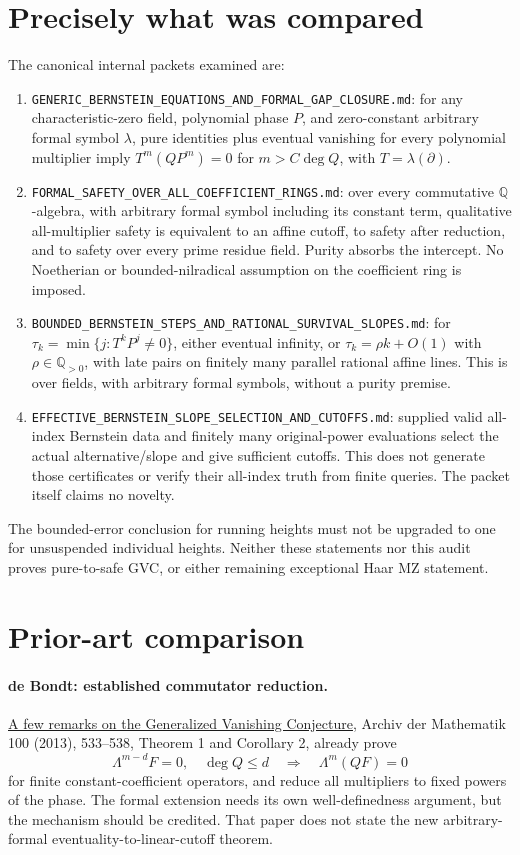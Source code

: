 \documentclass[11pt]{article}
\begin{document}
\section*{Precisely what was compared}
The canonical internal packets examined are:
\begin{enumerate}
\item \texttt{GENERIC\_BERNSTEIN\_EQUATIONS\_AND\_FORMAL\_GAP\_CLOSURE.md}: for any characteristic-zero field, polynomial phase $P$, and zero-constant arbitrary formal symbol $\lambda$, pure identities plus eventual vanishing for every polynomial multiplier imply $T^m(QP^m)=0$ for $m>C\deg Q$, with $T=\lambda(\partial)$.
\item \texttt{FORMAL\_SAFETY\_OVER\_ALL\_COEFFICIENT\_RINGS.md}: over every commutative $\mathbb Q$-algebra, with arbitrary formal symbol including its constant term, qualitative all-multiplier safety is equivalent to an affine cutoff, to safety after reduction, and to safety over every prime residue field. Purity absorbs the intercept. No Noetherian or bounded-nilradical assumption on the coefficient ring is imposed.
\item \texttt{BOUNDED\_BERNSTEIN\_STEPS\_AND\_RATIONAL\_SURVIVAL\_SLOPES.md}: for $\tau_k=\min\{j:T^kP^j\ne0\}$, either eventual infinity, or $\tau_k=\rho k+O(1)$ with $\rho\in\mathbb Q_{>0}$, with late pairs on finitely many parallel rational affine lines. This is over fields, with arbitrary formal symbols, without a purity premise.
\item \texttt{EFFECTIVE\_BERNSTEIN\_SLOPE\_SELECTION\_AND\_CUTOFFS.md}: supplied valid all-index Bernstein data and finitely many original-power evaluations select the actual alternative/slope and give sufficient cutoffs. This does not generate those certificates or verify their all-index truth from finite queries. The packet itself claims no novelty.
\end{enumerate}
The bounded-error conclusion for running heights must not be upgraded to one for unsuspended individual heights. Neither these statements nor this audit proves pure-to-safe GVC, or either remaining exceptional Haar MZ statement.

\section*{Prior-art comparison}
\paragraph{de Bondt: established commutator reduction.}
\href{https://arxiv.org/abs/1206.2836}{A few remarks on the Generalized Vanishing Conjecture}, Archiv der Mathematik 100 (2013), 533--538, Theorem 1 and Corollary 2, already prove
\[
 \Lambda^{m-d}F=0,\quad\deg Q\le d
 \quad\Longrightarrow\quad\Lambda^m(QF)=0
\]
for finite constant-coefficient operators, and reduce all multipliers to fixed powers of the phase. The formal extension needs its own well-definedness argument, but the mechanism should be credited. That paper does not state the new arbitrary-formal eventuality-to-linear-cutoff theorem.
\end{document}
